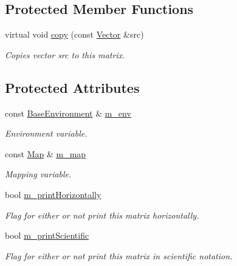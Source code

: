 \subsection*{Protected Member Functions}
\begin{DoxyCompactItemize}
\item 
virtual void \hyperlink{class_q_u_e_s_o_1_1_vector_a6f4d3aa282b2f2e1b191a17257a33c56}{copy} (const \hyperlink{class_q_u_e_s_o_1_1_vector}{Vector} \&src)
\begin{DoxyCompactList}\small\item\em Copies vector {\ttfamily src} to {\ttfamily this} matrix. \end{DoxyCompactList}\end{DoxyCompactItemize}
\subsection*{Protected Attributes}
\begin{DoxyCompactItemize}
\item 
const \hyperlink{class_q_u_e_s_o_1_1_base_environment}{Base\-Environment} \& \hyperlink{class_q_u_e_s_o_1_1_vector_ae7615172bb1e54339151d3f3d71a0344}{m\-\_\-env}
\begin{DoxyCompactList}\small\item\em Environment variable. \end{DoxyCompactList}\item 
const \hyperlink{class_q_u_e_s_o_1_1_map}{Map} \& \hyperlink{class_q_u_e_s_o_1_1_vector_aa99c771bc8d1aafff7277ed8f7fbd157}{m\-\_\-map}
\begin{DoxyCompactList}\small\item\em Mapping variable. \end{DoxyCompactList}\item 
bool \hyperlink{class_q_u_e_s_o_1_1_vector_a6bc4326d0e4f44f015bf2e30c7ee620d}{m\-\_\-print\-Horizontally}
\begin{DoxyCompactList}\small\item\em Flag for either or not print this matrix horizontally. \end{DoxyCompactList}\item 
bool \hyperlink{class_q_u_e_s_o_1_1_vector_a55d8e946571a9491a028ecb9a8a992a4}{m\-\_\-print\-Scientific}
\begin{DoxyCompactList}\small\item\em Flag for either or not print this matrix in scientific notation. \end{DoxyCompactList}\end{DoxyCompactItemize}


